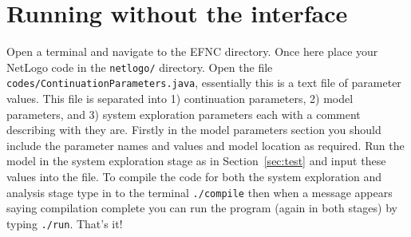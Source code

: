 \documentclass[11pt]{article}
\begin{document}
%
%
%


\newpage
\section{Running without the interface}
\label{sec:TERMINAL}
Open a terminal and navigate to the EFNC directory. Once here place your NetLogo code in the {\tt netlogo/} directory. Open the file {\tt codes/ContinuationParameters.java}, essentially this is a text file of parameter values. This file is separated into 1) continuation parameters, 2) model parameters, and 3) system exploration parameters each with a comment describing with they are. Firstly in the model parameters section you should include the parameter names and values and model location as required. Run the model in the system exploration stage as in Section~\ref{sec:test} and input these values into the file. To compile the code for both the system exploration and analysis stage type in to the terminal {\tt ./compile} then when a message appears saying compilation complete you can run the program (again in both stages) by typing {\tt ./run}. That's it! 
\end{document}
